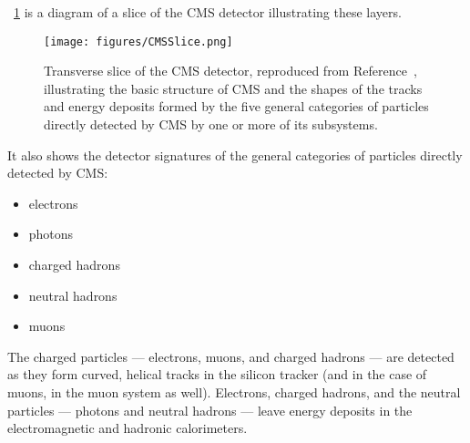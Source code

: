 \Fig~\ref{cms:interactive} is a diagram of a slice of the CMS detector illustrating these layers.
\begin{figure}[tpb]
  \centering
  \texttt{[image: figures/CMSSlice.png]}
  \caption{Transverse slice of the CMS detector, reproduced from Reference~\cite{Davis:2205172}, illustrating the basic structure of CMS and the shapes of the tracks and energy deposits formed by the five general categories of particles directly detected by CMS by one or more of its subsystems.}
  \label{cms:interactive}
\end{figure}
It also shows the detector signatures of the general categories of particles directly detected by CMS:
\begin{itemize}
  \item electrons
  \item photons
  \item charged hadrons
  \item neutral hadrons
  \item muons
\end{itemize}
The charged particles --- electrons, muons, and charged hadrons --- are detected as they form curved, helical tracks in the silicon tracker (and in the case of muons, in the muon system as well).
Electrons, charged hadrons, and the neutral particles --- photons and neutral hadrons --- leave energy deposits in the electromagnetic and hadronic calorimeters.

